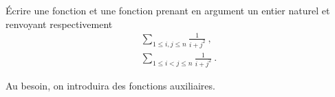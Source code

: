 \question{} Écrire une fonction  et une fonction  prenant en argument
un entier naturel  et renvoyant respectivement
\begin{gather}
  \sum_{1\leq i,j\leq n} \frac{1}{i+j^{2}}~, \\
  \sum_{1\leq i<j\leq n} \frac{1}{i+j^{2}}~.
\end{gather}

Au besoin, on introduira des fonctions auxiliaires.